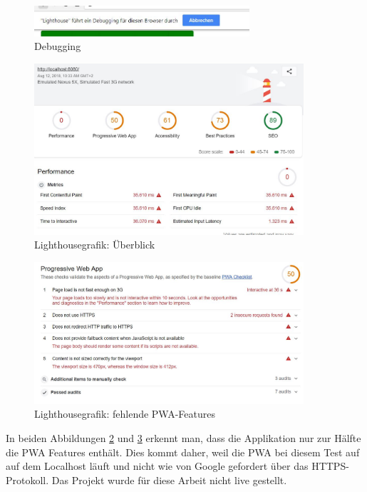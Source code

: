\begin{figure}[h]
	\centering
	\includegraphics[width=8cm]{BilderAllgemein/Test/debuggingLighthouse}\medskip
	\caption{Debugging}
	\label{fig:LighthouseDebugging}
\end{figure}
 

\begin{figure}[H]
	\centering
	\includegraphics[width=10cm]{BilderAllgemein/Test/LightH_beforHTTPS_Overview}\medskip
	\caption{Lighthousegrafik: Überblick}
	\label{fig:LightH_beforHTTPS_Overview}
\end{figure}

\begin{figure}[h]
	\centering
	\includegraphics[width=10cm]{BilderAllgemein/Test/PWA_Test_Lighthouse_noHTTPS}\medskip
	\caption{Lighthousegrafik: fehlende PWA-Features}
	\label{fig:PWA_Test_Lighthouse_noHTTPS}
\end{figure}

In beiden Abbildungen \ref{fig:LightH_beforHTTPS_Overview} und \ref{fig:PWA_Test_Lighthouse_noHTTPS} erkennt man, dass die Applikation nur zur Hälfte die PWA Features enthält.
Dies kommt daher, weil die \acs{PWA} bei diesem Test auf auf dem Localhost läuft und nicht wie von Google gefordert über das HTTPS-Protokoll.
Das Projekt wurde für diese Arbeit nicht live gestellt.



